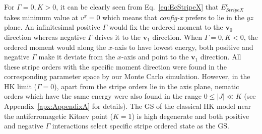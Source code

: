 \documentclass[aps,prb,reprint,amsfonts,amsmath,amssymb,showpacs,groupedaddress,superscriptaddress]{revtex4-1}
\begin{document}
For $\Gamma=0, K>0$, it can be clearly seen from Eq.~\eqref{eq:EcStripeX} that $E_{StripeX}^{c}$ takes minimum value at $v^x = 0$ which means that \emph{config-x} prefers to lie in the $yz$ plane. An infinitesimal positive $\Gamma$ would fix the ordered moment to the $\bm{v}_0$ direction whereas negative $\Gamma$ drives it to the $\bm{v}_1$ direction. When $\Gamma=0, K<0$, the ordered moment would along the $x$-axis to have lowest energy, both positive and negative $\Gamma$ make it deviate from the $x$-axis and point to the $\bm{v}_1$ direction. All these stripe orders with the specific moment direction were found in the corresponding parameter space by our Monte Carlo simulation. However, in the HK limit ($\Gamma=0$), apart from the stripe orders lie in the axis plane, nematic orders which have the same energy were also found in the range $0 \leq |J| \ll K$ (see Appendix~\ref{apx:AppendixA} for details). The GS of the classical HK model near the antiferromagetic Kitaev point ($K=1$) is high degenerate and both positive and negative $\Gamma$ interactions select specific stripe ordered state as the GS.
\end{document}
